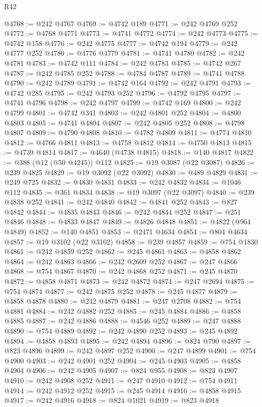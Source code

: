 \begin{lexlean}{R42}
\begin{coremodule}
{@4768 := @242 @4767
@4769 := @4742 @189
@4771 := @242 @4769 @252
@4772 := @4768 @4771
@4773 := @4741 @4772
@4774 := @242 @4773
@4775 := @4742 @158
@4776 := @242 @4775
@4777 := @4742 @194
@4779 := @242 @4777 @252
@4780 := @4776 @4779
@4781 := @4741 @4780
@4782 := @242 @4781
@4783 := @4742 @111
@4784 := @242 @4783
@4785 := @4742 @267
@4787 := @242 @4785 @252
@4788 := @4784 @4787
@4789 := @4741 @4788
@4790 := @242 @4789
@4791 := @4742 @164
@4792 := @242 @4791
@4793 := @4742 @285
@4795 := @242 @4793 @252
@4796 := @4792 @4795
@4797 := @4741 @4796
@4798 := @242 @4797
@4799 := @4742 @169
@4800 := @242 @4799
@4801 := @4742 @341
@4803 := @242 @4801 @252
@4804 := @4800 @4803
@4805 := @4741 @4804
@4807 := @242 @4805 @252
@4808 := @4798 @4807
@4809 := @4790 @4808
@4810 := @4782 @4809
@4811 := @4774 @4810
@4812 := @4766 @4811
@4813 := @4758 @4812
@4814 := @4750 @4813
@4815 := @4739 @4814
@4817 := @4640 (@4738 @4815)
@4818 := @140 @4817
@4822 := @388 (@12 (@50 @4245)) @112
@4825 := @19 @3087 (@22 @3087)
@4826 := @239 @4825
@4829 := @19 @3092 (@22 @3092)
@4830 := @489 @4829
@4831 := @249 @725
@4832 := @4830 @4831
@4833 := @242 @4832
@4834 := @1046 @112
@4835 := @361 @4834
@4838 := @19 @3097 (@22 @3097)
@4840 := @239 @4838 @252
@4841 := @242 @4840
@4842 := @4841 @252
@4843 := @827 @4842
@4844 := @4835 @4843
@4846 := @242 @4844 @252
@4847 := @251 @4846
@4848 := @4833 @4847
@4849 := @4826 @4848
@4851 := @4822 (@964 @4849)
@4852 := @140 @4851
@4853 := @2471 @4634
@4854 := @804 @4634
@4857 := @19 @3102 (@22 @3102)
@4858 := @239 @4857
@4859 := @754 @1830
@4861 := @242 @4859 @252
@4862 := @245 @4861
@4863 := @4858 @4862
@4864 := @242 @4863
@4866 := @242 @2609 @252
@4867 := @247 @4866
@4868 := @754 @4867
@4870 := @242 @4868 @252
@4871 := @245 @4870
@4872 := @4858 @4871
@4873 := @242 @4872
@4874 := @247 @2694
@4875 := @754 @4874
@4877 := @242 @4875 @252
@4878 := @245 @4877
@4879 := @4858 @4878
@4880 := @242 @4879
@4881 := @247 @2708
@4882 := @754 @4881
@4884 := @242 @4882 @252
@4885 := @245 @4884
@4886 := @4858 @4885
@4887 := @242 @4886
@4888 := @4546 @252
@4889 := @247 @4888
@4890 := @754 @4889
@4892 := @242 @4890 @252
@4893 := @245 @4892
@4894 := @4858 @4893
@4895 := @242 @4894
@4896 := @824 @790
@4897 := @823 @4896
@4899 := @242 @4897 @252
@4900 := @247 @4899
@4901 := @754 @4900
@4903 := @242 @4901 @252
@4904 := @245 @4903
@4905 := @4858 @4904
@4906 := @242 @4905
@4907 := @824 @955
@4908 := @823 @4907
@4910 := @242 @4908 @252
@4911 := @247 @4910
@4912 := @754 @4911
@4914 := @242 @4912 @252
@4915 := @245 @4914
@4916 := @4858 @4915
@4917 := @242 @4916
@4918 := @824 @1021
@4919 := @823 @4918
}
\end{coremodule}
\end{lexlean}
